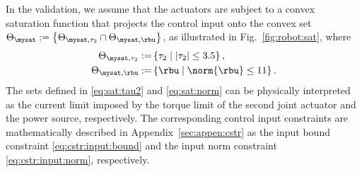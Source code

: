 \documentclass[journal]{IEEEtran}
\begin{document}
In the validation, we assume that the actuators are subject to a convex saturation function that projects the control input onto the convex set 
$
    \Theta_{\mysat} :=\left\{ \Theta_{\mysat, {\tau_2}} \cap \Theta_{\mysat, {\rbu}} \right\}
$, as illustrated in Fig.~\ref{fig:robot:sat}, where
\begin{subequations}
    \begin{align}
        \Theta_{\mysat, {\tau_2}}
        :=&
        \left\{
            \tau_2
            \mid
            \vert{\tau_2}\vert \le 
            3.5
        \right\}
        ,
        \label{eq:sat:tau2}
        \\    
        \Theta_{\mysat, {\rbu}}
        :=&
        \left\{
            \rbu
            \mid
            \norm{\rbu} \le 
            11
        \right\}
        .
        \label{eq:sat:norm}
    \end{align}
    \label{eq:sat}%
\end{subequations}
The sets defined in \eqref{eq:sat:tau2} and \eqref{eq:sat:norm} can be physically interpreted as the current limit imposed by the torque limit of the second joint actuator and the power source, respectively.
The corresponding control input constraints are mathematically described in Appendix~\ref{sec:appen:cstr} as the input bound constraint \eqref{eq:cstr:input:bound} and the input norm constraint \eqref{eq:cstr:input:norm}, respectively.
\end{document}
